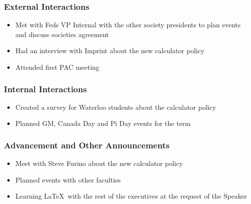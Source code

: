 \subsubsection*{External Interactions}
\begin{itemize}
\item Met with Feds VP Internal with the other society presidents to plan events and discuss societies agreement
\item Had an interview with Imprint about the new calculator policy 
\item Attended first PAC meeting
\end{itemize}

\subsubsection*{Internal Interactions}
\begin{itemize}
\item Created a survey for Waterloo students about the calculator policy
\item Planned GM, Canada Day and Pi Day events for the term
\end{itemize}

\subsubsection*{Advancement and Other Announcements}
\begin{itemize}
\item Meet with Steve Furino about the new calculator policy
\item Planned events with other faculties
\item Learning \LaTeX\ with the rest of the executives at the request of the Speaker
\end{itemize}